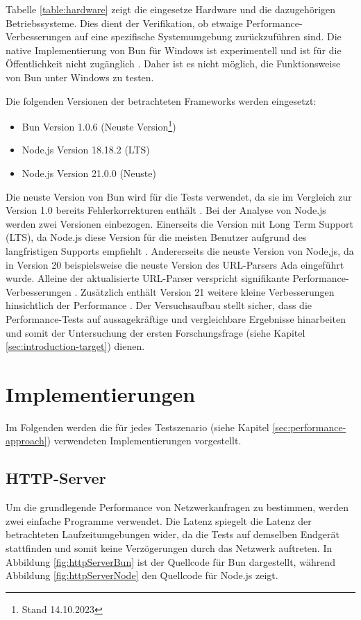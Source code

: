 \noindent
Tabelle \ref{table:hardware} zeigt die eingesetze Hardware und die dazugehörigen Betriebssysteme. Dies dient der Verifikation, ob etwaige Performance-Verbesserungen auf eine spezifische Systemumgebung zurückzuführen sind. Die native Implementierung von Bun für Windows ist experimentell und ist für die Öffentlichkeit nicht zugänglich \cite{Verhelst.2023}. Daher ist es nicht möglich, die Funktionsweise von Bun unter Windows zu testen.

\noindent
Die folgenden Versionen der betrachteten Frameworks werden eingesetzt:
\begin{itemize}
	\item Bun Version 1.0.6 (Neuste Version\footnote{Stand 14.10.2023\label{footnote:Stand}})
	\item Node.js Version 18.18.2 (LTS)
	\item Node.js Version 21.0.0 (Neuste)
\end{itemize}

\noindent
Die neuste Version von Bun wird für die Tests verwendet, da sie im Vergleich zur Version 1.0 bereits Fehlerkorrekturen enthält \cite{Sumner.2023}. Bei der Analyse von Node.js werden zwei Versionen einbezogen. Einerseits die Version mit Long Term Support (LTS), da Node.js diese Version für die meisten Benutzer aufgrund des langfristigen Supports empfiehlt \cite{OpenJSFoundation.o.J.}. Andererseits die neuste Version von Node,js, da in Version 20 beispielsweise die neuste Version des URL-Parsers Ada eingeführt wurde. Alleine der aktualisierte URL-Parser verspricht signifikante Performance-Verbesserungen \cite{OpenJSFoundation.2023}. Zusätzlich enthält Version 21 weitere kleine Verbesserungen hinsichtlich der Performance \cite{OpenJSFoundation.2023b}. \newline
Der Versuchsaufbau stellt sicher, dass die Performance-Tests auf aussagekräftige und vergleichbare Ergebnisse hinarbeiten und somit der Untersuchung der ersten Forschungsfrage (siehe Kapitel \ref{sec:introduction-target}) dienen.

\section{Implementierungen} \label{sec:performance-implementations}
Im Folgenden werden die für jedes Testszenario (siehe Kapitel \ref{sec:performance-approach}) verwendeten Implementierungen vorgestellt.

\subsection{HTTP-Server} \label{subsec:httpServer}
Um die grundlegende Performance von Netzwerkanfragen zu bestimmen, werden zwei einfache Programme verwendet. Die Latenz spiegelt die Latenz der betrachteten Laufzeitumgebungen wider, da die Tests auf demselben Endgerät stattfinden und somit keine Verzögerungen durch das Netzwerk auftreten. In Abbildung \ref{fig:httpServerBun} ist der Quellcode für Bun dargestellt, während Abbildung \ref{fig:httpServerNode} den Quellcode für Node.js zeigt.

